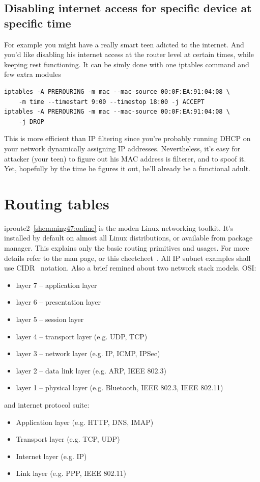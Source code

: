\documentclass[times, utf8, seminar, english]{fer}
\begin{document}
\section{Disabling internet access for specific device at specific time}

For example you might have a really smart teen adicted to the internet.
And you'd like disabling his internet access at the router level at certain times, while keeping rest functioning.
It can be simly done with one iptables command and few extra modules

\begin{verbatim}
iptables -A PREROURING -m mac --mac-source 00:0F:EA:91:04:08 \
    -m time --timestart 9:00 --timestop 18:00 -j ACCEPT
iptables -A PREROURING -m mac --mac-source 00:0F:EA:91:04:08 \
    -j DROP
\end{verbatim}

This is more efficient than IP filtering since you're probably running DHCP on your network dynamically assigning IP addresses.
Nevertheless, it's easy for attacker (your teen) to figure out his MAC address is filterer, and to spoof it.
Yet, hopefully by the time he figures it out, he'll already be a functional adult.


\chapter{Routing tables}
iproute2~\ref{shemming47:online} is the moden Linux networking toolkit. It's installed by default on almost all Linux distributions, or available from package manager. This explains only the basic routing primitives and usages. For more details refer to the man page, or this cheetcheet~\cite{iproute285:online}. All IP subnet examples shall use CIDR~\cite{Classles63:online} notation. Also a brief remined about two network stack models. OSI:
    \begin{itemize}
        \item layer 7 -- application layer
        \item layer 6 -- presentation layer
        \item layer 5 -- session layer
        \item layer 4 -- transport layer (e.g. UDP, TCP)
        \item layer 3 -- network layer (e.g. IP, ICMP, IPSec)
        \item layer 2 -- data link layer (e.g. ARP, IEEE 802.3)
        \item layer 1 -- physical layer (e.g. Bluetooth, IEEE 802.3, IEEE 802.11)
    \end{itemize}
    and internet protocol suite:
    \begin{itemize}
        \item Application layer (e.g. HTTP, DNS, IMAP)
        \item Transport layer (e.g. TCP, UDP)
        \item Internet layer (e.g. IP)
        \item Link layer (e.g. PPP, IEEE 802.11)
    \end{itemize}
\end{document}
